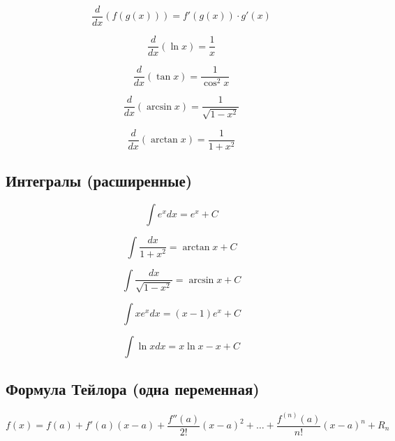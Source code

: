 \documentclass[a4paper,12pt]{article}
\begin{document}
\begin{equation}
\frac{d}{dx}(f(g(x))) = f'(g(x)) \cdot g'(x)
\end{equation}

\begin{equation}
\frac{d}{dx}(\ln x) = \frac{1}{x}
\end{equation}

\begin{equation}
\frac{d}{dx}(\tan x) = \frac{1}{\cos^2 x}
\end{equation}

\begin{equation}
\frac{d}{dx}(\arcsin x) = \frac{1}{\sqrt{1-x^2}}
\end{equation}

\begin{equation}
\frac{d}{dx}(\arctan x) = \frac{1}{1+x^2}
\end{equation}

\subsection{Интегралы (расширенные)}

\begin{equation}
\int e^x dx = e^x + C
\end{equation}

\begin{equation}
\int \frac{dx}{1+x^2} = \arctan x + C
\end{equation}

\begin{equation}
\int \frac{dx}{\sqrt{1-x^2}} = \arcsin x + C
\end{equation}

\begin{equation}
\int x e^x dx = (x-1)e^x + C
\end{equation}

\begin{equation}
\int \ln x  dx = x \ln x - x + C
\end{equation}

\subsection{Формула Тейлора (одна переменная)}

\begin{equation}
f(x) = f(a) + f'(a)(x-a) + \frac{f''(a)}{2!}(x-a)^2 + \dots + \frac{f^{(n)}(a)}{n!}(x-a)^n + R_n
\end{equation}
\end{document}

